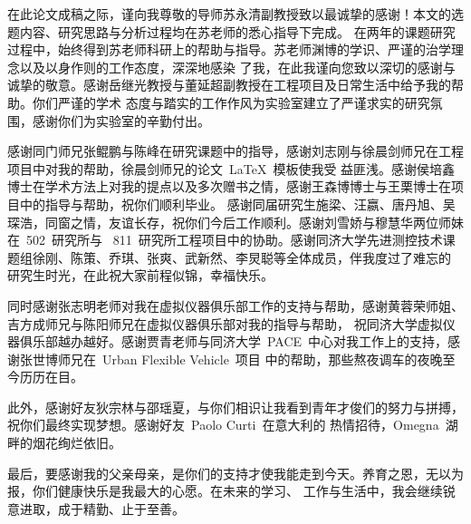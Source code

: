 在此论文成稿之际，谨向我尊敬的导师苏永清副教授致以最诚挚的感谢！本文的选题内容、研究思路与分析过程均在苏老师的悉心指导下完成。
在两年的课题研究过程中，始终得到苏老师科研上的帮助与指导。苏老师渊博的学识、严谨的治学理念以及以身作则的工作态度，深深地感染
了我，在此我谨向您致以深切的感谢与诚挚的敬意。感谢岳继光教授与董延超副教授在工程项目及日常生活中给予我的帮助。你们严谨的学术
态度与踏实的工作作风为实验室建立了严谨求实的研究氛围，感谢你们为实验室的辛勤付出。

感谢同门师兄张鲲鹏与陈峰在研究课题中的指导，感谢刘志刚与徐晨剑师兄在工程项目中对我的帮助，徐晨剑师兄的论文~\LaTeX~模板使我受
益匪浅。感谢侯培鑫博士在学术方法上对我的提点以及多次赠书之情，感谢王森博博士与王栗博士在项目中的指导与帮助，祝你们顺利毕业。
感谢同届研究生施梁、汪嬴、唐丹旭、吴琛浩，同窗之情，友谊长存，祝你们今后工作顺利。感谢刘雪娇与穆慧华两位师妹在~502~研究所与
~811~研究所工程项目中的协助。感谢同济大学先进测控技术课题组徐刚、陈策、乔琪、张爽、武新然、李炅聪等全体成员，伴我度过了难忘的
研究生时光，在此祝大家前程似锦，幸福快乐。

同时感谢张志明老师对我在虚拟仪器俱乐部工作的支持与帮助，感谢黄蓉荣师姐、吉方成师兄与陈阳师兄在虚拟仪器俱乐部对我的指导与帮助，
祝同济大学虚拟仪器俱乐部越办越好。感谢贾青老师与同济大学~PACE~中心对我工作上的支持，感谢张世博师兄在~Urban Flexible Vehicle~项目
中的帮助，那些熬夜调车的夜晚至今历历在目。

此外，感谢好友狄宗林与邵瑶夏，与你们相识让我看到青年才俊们的努力与拼搏，祝你们最终实现梦想。感谢好友~Paolo Curti~在意大利的
热情招待，Omegna~湖畔的烟花绚烂依旧。


最后，要感谢我的父亲母亲，是你们的支持才使我能走到今天。养育之恩，无以为报，你们健康快乐是我最大的心愿。在未来的学习、
工作与生活中，我会继续锐意进取，成于精勤、止于至善。


~~\\



